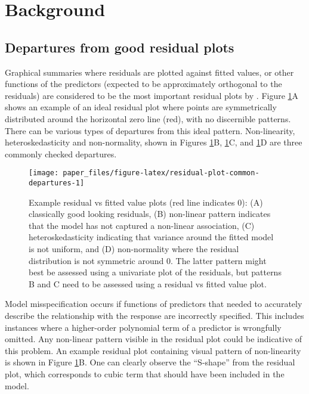 \documentclass[]{interact}
\theoremstyle{plain}%
\theoremstyle{definition}
\theoremstyle{remark}
\begin{document}
\hypertarget{background}{%
\section{Background}\label{background}}

\hypertarget{departures-from-good-residual-plots}{%
\subsection{Departures from good residual
plots}\label{departures-from-good-residual-plots}}

Graphical summaries where residuals are plotted against fitted values,
or other functions of the predictors (expected to be approximately
orthogonal to the residuals) are considered to be the most important
residual plots by \citet{cook1999applied}. Figure
\ref{fig:residual-plot-common-departures}A shows an example of an ideal
residual plot where points are symmetrically distributed around the
horizontal zero line (red), with no discernible patterns. There can be
various types of departures from this ideal pattern. Non-linearity,
heteroskedasticity and non-normality, shown in Figures
\ref{fig:residual-plot-common-departures}B,
\ref{fig:residual-plot-common-departures}C, and
\ref{fig:residual-plot-common-departures}D are three commonly checked
departures.

\begin{figure}[t!]

{\centering \texttt{[image: paper\_files/figure-latex/residual-plot-common-departures-1]} 

}

\caption{Example residual vs fitted value plots (red line indicates 0): (A) classically good looking residuals, (B) non-linear pattern indicates that the model has not captured a non-linear association, (C) heteroskedasticity indicating that variance around the fitted model is not uniform, and (D) non-normality where the residual distribution is not symmetric around 0. The latter pattern might best be assessed using a univariate plot of the residuals, but patterns B and C need to be assessed using a residual vs fitted value plot.}\label{fig:residual-plot-common-departures}
\end{figure}

Model misspecification occurs if functions of predictors that needed to
accurately describe the relationship with the response are incorrectly
specified. This includes instances where a higher-order polynomial term
of a predictor is wrongfully omitted. Any non-linear pattern visible in
the residual plot could be indicative of this problem. An example
residual plot containing visual pattern of non-linearity is shown in
Figure \ref{fig:residual-plot-common-departures}B. One can clearly
observe the ``S-shape'' from the residual plot, which corresponds to
cubic term that should have been included in the model.
\end{document}
